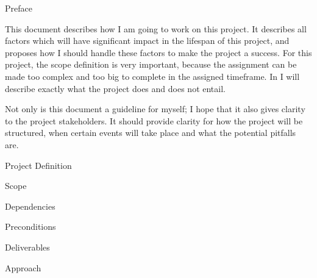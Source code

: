 \documentclass{matthijs}
\begin{document}

	\begin{titelpagina}


	\end{titelpagina}

	\begin{hoofdstuk}{Preface}

		This document describes how I am going to work on this project.
		It describes all factors which will have significant impact in the lifespan of this project, and proposes how I should handle these factors to make the project a success.
		For this project, the scope definition is very important, because the assignment can be made too complex and too big to complete in the assigned timeframe. In  I will describe exactly what the project does and does not entail.
		
		Not only is this document a guideline for myself; I hope that it also gives clarity to the project stakeholders. It should provide clarity for how the project will be structured, when certain events will take place and what the potential pitfalls are.

		
	\end{hoofdstuk}
	
	\begin{hoofdstuk}{Project Definition}

		\begin{paragraaf}{Scope}

		\end{paragraaf}

		\begin{paragraaf}{Dependencies}

		\end{paragraaf}

		\begin{paragraaf}{Preconditions}

		\end{paragraaf}

	\end{hoofdstuk}

	\begin{hoofdstuk}{Deliverables}

	\end{hoofdstuk}

	\begin{hoofdstuk}{Approach}

	\end{hoofdstuk}
\end{document}
